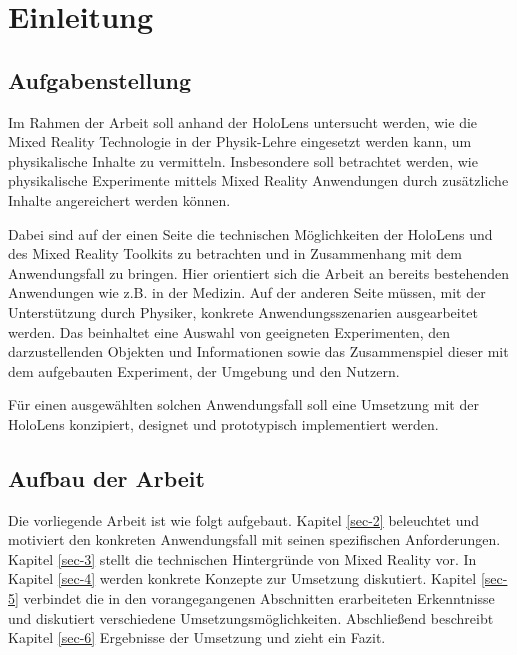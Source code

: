 \section{Einleitung}
\label{sec-1}


\subsection{Aufgabenstellung}
\label{sec-1-1}
Im Rahmen der Arbeit soll anhand der HoloLens untersucht werden, wie die Mixed Reality Technologie in der Physik-Lehre eingesetzt werden kann, um physikalische Inhalte zu vermitteln. Insbesondere soll betrachtet werden, wie physikalische Experimente mittels Mixed Reality Anwendungen durch zusätzliche Inhalte angereichert werden können.

Dabei sind auf der einen Seite die technischen Möglichkeiten der HoloLens und des Mixed Reality Toolkits zu betrachten und in Zusammenhang mit dem Anwendungsfall zu bringen. Hier orientiert sich die Arbeit an bereits bestehenden Anwendungen wie z.B. in der Medizin. Auf der anderen Seite müssen, mit der Unterstützung durch Physiker, konkrete Anwendungsszenarien ausgearbeitet werden. Das beinhaltet eine Auswahl von geeigneten Experimenten, den darzustellenden Objekten und Informationen sowie das Zusammenspiel dieser mit dem aufgebauten Experiment, der Umgebung und den Nutzern.

Für einen ausgewählten solchen Anwendungsfall soll eine Umsetzung mit der HoloLens konzipiert, designet und prototypisch implementiert werden.

\subsection{Aufbau der Arbeit}
\label{sec-1-2}

Die vorliegende Arbeit ist wie folgt aufgebaut. Kapitel \ref{sec-2} beleuchtet und motiviert den konkreten Anwendungsfall mit seinen spezifischen Anforderungen. Kapitel \ref{sec-3} stellt die technischen Hintergründe von Mixed Reality vor. In Kapitel \ref{sec-4} werden konkrete Konzepte zur Umsetzung diskutiert. Kapitel \ref{sec-5} verbindet die in den vorangegangenen Abschnitten erarbeiteten Erkenntnisse und diskutiert verschiedene Umsetzungsmöglichkeiten. Abschließend beschreibt Kapitel \ref{sec-6} Ergebnisse der Umsetzung und zieht ein Fazit.